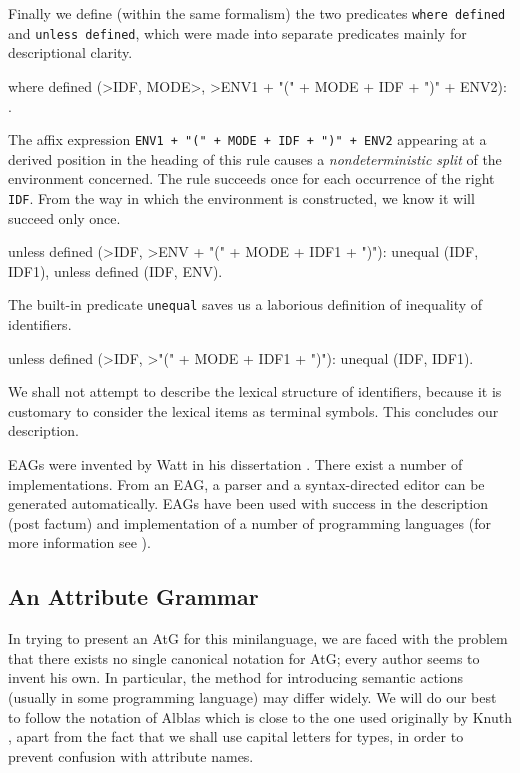 Finally we define (within the same formalism) the two predicates
{\tt where defined} and {\tt unless defined}, which were made into
separate predicates mainly for descriptional clarity.
\begin{elan}
where defined (>IDF, MODE>, >ENV1 + "(" + MODE + IDF + ")" + ENV2):  .
\end{elan}
The affix expression {\tt ENV1 + "(" + MODE + IDF + ")" + ENV2} appearing at a
derived position in the heading of this rule causes a
{\em nondeterministic split}
of the environment concerned. The rule succeeds once for each
occurrence of the right {\tt IDF}.
From the way in which the environment is
constructed, we know it will succeed only once.
\begin{elan}
unless defined (>IDF, >ENV + "(" + MODE + IDF1 + ")"):
    unequal (IDF, IDF1), unless defined (IDF, ENV).
\end{elan}
The built-in predicate {\tt unequal} saves us a laborious definition of
inequality of identifiers.
\begin{elan}
unless defined (>IDF, >"(" + MODE + IDF1 + ")"):
    unequal (IDF, IDF1).
\end{elan}
We shall not attempt to describe the lexical structure of identifiers,
because
it is customary to consider the lexical items as terminal symbols.
This concludes our description.

EAGs were invented by Watt in his dissertation \cite{watt:diss}.
There exist a number of implementations.
From an EAG, a parser and a syntax-directed editor can be generated
automatically. EAGs have been used with success in the
description (post factum)
and implementation of a number of programming languages
(for more information see \cite{meijer:eagproj}).

\subsection{An Attribute Grammar}
In trying to present an AtG for this minilanguage, we
are faced with the problem that there exists no single canonical
notation for AtG; every author seems to invent his own.
In particular, the method for introducing semantic actions
(usually in some programming language) may differ widely.
We will do our best to follow the notation of Alblas
\cite{alblas:attrevmeth} which is close to the one used originally by
Knuth \cite{knuth:atg}, apart from the fact that we
shall use capital letters for types, in order to prevent confusion
with attribute names.

